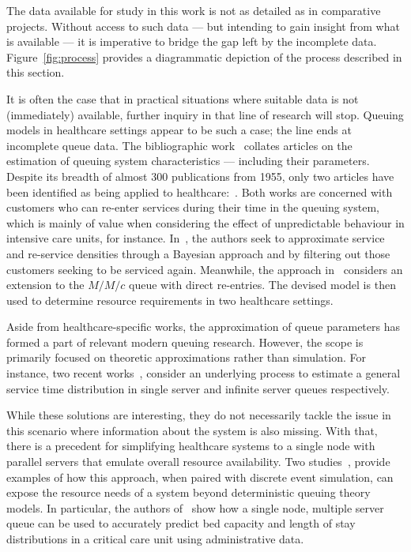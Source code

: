 \documentclass[]{interact}
\theoremstyle{plain}%
\theoremstyle{definition}
\theoremstyle{remark}
\begin{document}
The data available for study in this work is not as detailed as in comparative
projects. Without access to such data --- but intending to gain insight from
what is available --- it is imperative to bridge the gap left by the incomplete
data. Figure~\ref{fig:process} provides a diagrammatic depiction of the process
described in this section.

It is often the case that in practical situations where suitable data is not
(immediately) available, further inquiry in that line of research will stop.
Queuing models in healthcare settings appear to be such a case; the line ends at
incomplete queue data. The bibliographic work~\cite{Asanjarani2017} collates
articles on the estimation of queuing system characteristics --- including their
parameters. Despite its breadth of almost 300 publications from 1955, only two
articles have been identified as being applied to
healthcare:~\cite{Mohammadi2012,Yom2014}. Both works are concerned with
customers who can re-enter services during their time in the queuing system,
which is mainly of value when considering the effect of unpredictable behaviour
in intensive care units, for instance. In~\cite{Mohammadi2012}, the authors seek
to approximate service and re-service densities through a Bayesian approach and
by filtering out those customers seeking to be serviced again. Meanwhile, the
approach in~\cite{Yom2014} considers an extension to the \(M/M/c\) queue with
direct re-entries. The devised model is then used to determine resource
requirements in two healthcare settings.

Aside from healthcare-specific works, the approximation of queue parameters has
formed a part of relevant modern queuing research. However, the scope is
primarily focused on theoretic approximations rather than simulation. For
instance, two recent works~\citep{Djabali2018,Goldenshluger2016}, consider an
underlying process to estimate a general service time distribution in single
server and infinite server queues respectively.

While these solutions are interesting, they do not necessarily tackle the issue
in this scenario where information about the system is also missing. With that,
there is a precedent for simplifying healthcare systems to a single node with
parallel servers that emulate overall resource availability. Two
studies~\citep{Steins2013,Williams2015}, provide examples of how this approach,
when paired with discrete event simulation, can expose the resource needs of a
system beyond deterministic queuing theory models. In particular, the authors
of~\cite{Williams2015} show how a single node, multiple server queue can be used
to accurately predict bed capacity and length of stay distributions in a
critical care unit using administrative data.
\end{document}
